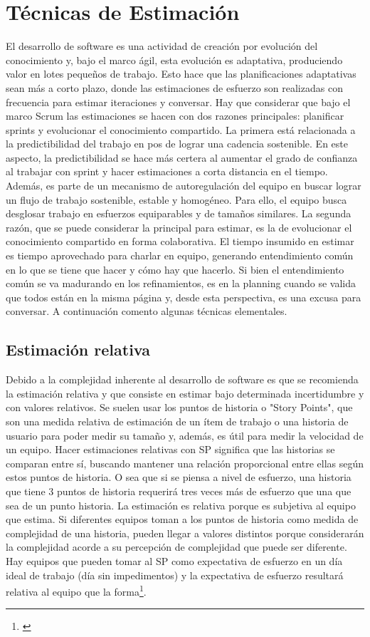 \section{Técnicas de Estimación}

El desarrollo de software es una actividad de creación por evolución del conocimiento y, bajo el marco ágil, esta evolución es adaptativa, produciendo valor en lotes pequeños de trabajo. Esto hace que las planificaciones adaptativas sean más a corto plazo, donde las estimaciones de esfuerzo son realizadas con frecuencia para estimar iteraciones y conversar. Hay que considerar que bajo el marco Scrum las estimaciones se hacen con dos razones principales: planificar sprints y evolucionar el conocimiento compartido. La primera está relacionada a la predictibilidad del trabajo en pos de lograr una cadencia sostenible. En este aspecto, la predictibilidad se hace más certera al aumentar el grado de confianza al trabajar con sprint y hacer estimaciones a corta distancia en el tiempo. Además, es parte de un mecanismo de autoregulación del equipo en buscar lograr un flujo de trabajo sostenible, estable y homogéneo. Para ello, el equipo busca desglosar trabajo en esfuerzos equiparables y de tamaños similares. La segunda razón, que se puede considerar la principal para estimar, es la de evolucionar el conocimiento compartido en forma colaborativa. El tiempo insumido en estimar es tiempo aprovechado para charlar en equipo, generando entendimiento común en lo que se tiene que hacer y cómo hay que hacerlo. Si bien el entendimiento común se va madurando en los refinamientos, es en la planning cuando se valida que todos están en la misma página y, desde esta perspectiva, es una excusa para conversar. A continuación comento algunas técnicas elementales.

\subsection{Estimación relativa}

Debido a la complejidad inherente al desarrollo de software es que se recomienda la estimación relativa y que consiste en estimar bajo determinada incertidumbre y con valores relativos. Se suelen usar los puntos de historia o "Story Points", que son una medida relativa de estimación de un ítem de trabajo o una historia de usuario para poder medir su tamaño y, además, es útil para medir la velocidad de un equipo. Hacer estimaciones relativas con SP significa que las historias se comparan entre sí, buscando mantener una relación proporcional entre ellas según estos puntos de historia. O sea que si se piensa a nivel de esfuerzo, una historia que tiene 3 puntos de historia requerirá tres veces más de esfuerzo que una que sea de un punto historia.
La estimación es relativa porque es subjetiva al equipo que estima. Si diferentes equipos toman a los puntos de historia como medida de complejidad de una historia, pueden llegar a valores distintos porque considerarán la complejidad acorde a su percepción de complejidad que puede ser diferente. Hay equipos que pueden tomar al SP como expectativa de esfuerzo en un día ideal de trabajo (día sin impedimentos) y la expectativa de esfuerzo resultará relativa al equipo que la forma\footnote{\cite{Cohn-2004}}.

